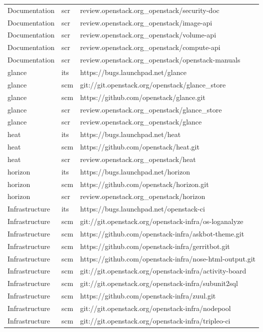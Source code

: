 \begin{center}
\begin{longtable}{|p{4cm}|p{1cm}|p{10cm}|}
Documentation&scr&review.openstack.org\_openstack/security-doc\\ 
Documentation&scr&review.openstack.org\_openstack/image-api\\ 
Documentation&scr&review.openstack.org\_openstack/volume-api\\ 
Documentation&scr&review.openstack.org\_openstack/compute-api\\ 
Documentation&scr&review.openstack.org\_openstack/openstack-manuals\\ 
glance&its&https://bugs.launchpad.net/glance\\ 
glance&scm&git://git.openstack.org/openstack/glance\_store\\ 
glance&scm&https://github.com/openstack/glance.git\\ 
glance&scr&review.openstack.org\_openstack/glance\_store\\ 
glance&scr&review.openstack.org\_openstack/glance\\ 
heat&its&https://bugs.launchpad.net/heat\\ 
heat&scm&https://github.com/openstack/heat.git\\ 
heat&scr&review.openstack.org\_openstack/heat\\ 
horizon&its&https://bugs.launchpad.net/horizon\\ 
horizon&scm&https://github.com/openstack/horizon.git\\ 
horizon&scr&review.openstack.org\_openstack/horizon\\ 
Infrastructure&its&https://bugs.launchpad.net/openstack-ci\\ 
Infrastructure&scm&git://git.openstack.org/openstack-infra/os-loganalyze\\ 
Infrastructure&scm&https://github.com/openstack-infra/askbot-theme.git\\ 
Infrastructure&scm&https://github.com/openstack-infra/gerritbot.git\\ 
Infrastructure&scm&https://github.com/openstack-infra/nose-html-output.git\\ 
Infrastructure&scm&git://git.openstack.org/openstack-infra/activity-board\\ 
Infrastructure&scm&git://git.openstack.org/openstack-infra/subunit2sql\\ 
Infrastructure&scm&https://github.com/openstack-infra/zuul.git\\ 
Infrastructure&scm&git://git.openstack.org/openstack-infra/nodepool\\ 
Infrastructure&scm&git://git.openstack.org/openstack-infra/tripleo-ci\\ 

\end{longtable}
\end{center}
